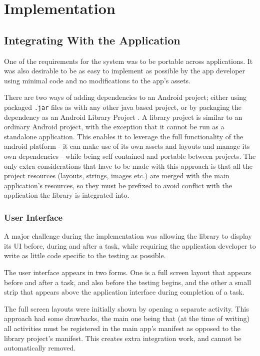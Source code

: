 \chapter{Implementation}

\section{Integrating With the Application}

One of the requirements for the system was to be portable across
applications. It was also desirable to be as easy to implement
as possible by the app developer using minimal code and no
modifications to the app's assets.

There are two ways of adding dependencies to an Android project;
either using packaged \verb/.jar/ files as with any other java based
project, or by packaging the dependency as an Android Library
Project \cite{android-library}. A library project is similar to
an ordinary Android project, with the exception that it cannot
be run as a standalone application. This enables it to leverage
 the full functionality of the android
platform - it can make use of its own assets and layouts and manage
its own dependencies - while being self contained and portable
between projects. The only extra considerations that have to be
made with this approach is that all the project resources
(layouts, strings, images etc.) are merged with the main application's
resources, so they must be prefixed to avoid conflict with
the application the library is integrated into.

\subsection{User Interface}

A major challenge during the implementation was allowing the library
to display its UI before, during and after a task, while requiring
the application developer to write as little code specific to the
testing as possible.

The user interface appears in two forms. One is a full screen layout
that appears before and after a task, and also before the testing
begins, and the other a small strip that appears above the 
application interface during completion of a task.

The full screen layouts were initially shown by opening a separate
activity. This approach had some drawbacks, the main one being that
(at the time of writing) all activities must be registered in the
main app's manifest as opposed to the library project's manifest.
This creates extra integration work, and cannot be automatically
removed. 


